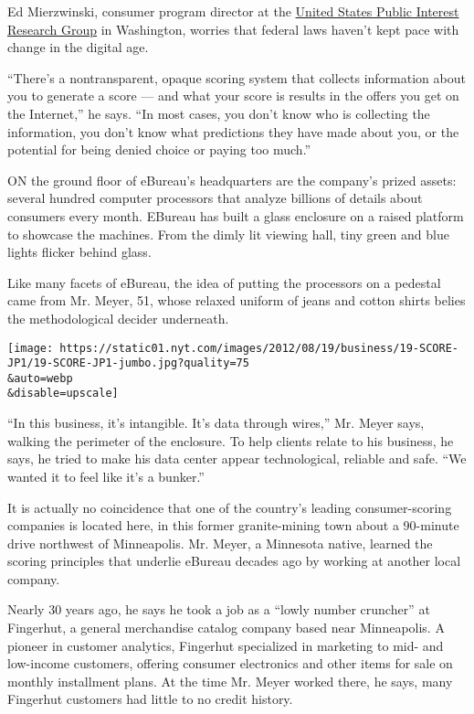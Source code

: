 Ed Mierzwinski, consumer program director at the
\href{http://www.uspirg.org/}{United States Public Interest Research
Group} in Washington, worries that federal laws haven't kept pace with
change in the digital age.

``There's a nontransparent, opaque scoring system that collects
information about you to generate a score --- and what your score is
results in the offers you get on the Internet,'' he says. ``In most
cases, you don't know who is collecting the information, you don't know
what predictions they have made about you, or the potential for being
denied choice or paying too much.''

ON the ground floor of eBureau's headquarters are the company's prized
assets: several hundred computer processors that analyze billions of
details about consumers every month. EBureau has built a glass enclosure
on a raised platform to showcase the machines. From the dimly lit
viewing hall, tiny green and blue lights flicker behind glass.

Like many facets of eBureau, the idea of putting the processors on a
pedestal came from Mr. Meyer, 51, whose relaxed uniform of jeans and
cotton shirts belies the methodological decider underneath.

\texttt{[image: https://static01.nyt.com/images/2012/08/19/business/19-SCORE-JP1/19-SCORE-JP1-jumbo.jpg?quality=75\\\&auto=webp\\\&disable=upscale]}

``In this business, it's intangible. It's data through wires,'' Mr.
Meyer says, walking the perimeter of the enclosure. To help clients
relate to his business, he says, he tried to make his data center appear
technological, reliable and safe. ``We wanted it to feel like it's a
bunker.''

It is actually no coincidence that one of the country's leading
consumer-scoring companies is located here, in this former
granite-mining town about a 90-minute drive northwest of Minneapolis.
Mr. Meyer, a Minnesota native, learned the scoring principles that
underlie eBureau decades ago by working at another local company.

Nearly 30 years ago, he says he took a job as a ``lowly number
cruncher'' at Fingerhut, a general merchandise catalog company based
near Minneapolis. A pioneer in customer analytics, Fingerhut specialized
in marketing to mid- and low-income customers, offering consumer
electronics and other items for sale on monthly installment plans. At
the time Mr. Meyer worked there, he says, many Fingerhut customers had
little to no credit history.

